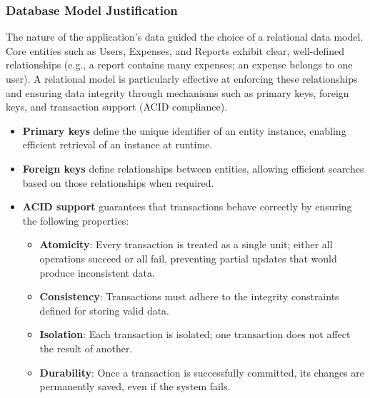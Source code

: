 \subsubsection{Database Model Justification}

The nature of the application's data guided the choice of a relational data model. Core entities such as Users, Expenses, and Reports exhibit clear, well-defined relationships (e.g., a report contains many expenses; an expense belongs to one user). A relational model is particularly effective at enforcing these relationships and ensuring data integrity through mechanisms such as primary keys, foreign keys, and transaction support (ACID compliance). 

\begin{itemize} [leftmargin=0.75cm, noitemsep, label=$\bullet$]

    \item \textbf{Primary keys} define the unique identifier of an entity instance, enabling efficient retrieval of an instance at runtime. 

    \item \textbf{Foreign keys} define relationships between entities, allowing efficient searches based on those relationships when required. 

    \item \textbf{ACID support} guarantees that transactions behave correctly by ensuring the following properties:

    \begin{itemize} [leftmargin=0.75cm, noitemsep, label=$\circ$]
        \item \textbf{Atomicity}: Every transaction is treated as a single unit; either all operations succeed or all fail, preventing partial updates that would produce inconsistent data.

        \item \textbf{Consistency}: Transactions must adhere to the integrity constraints defined for storing valid data.

        \item \textbf{Isolation}: Each transaction is isolated; one transaction does not affect the result of another.

        \item \textbf{Durability}: Once a transaction is successfully committed, its changes are permanently saved, even if the system fails.
    \end{itemize}

\end{itemize}